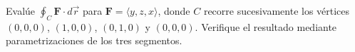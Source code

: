 ﻿Evalúe $\oint_C\mathbf F\cdot d\vec r$ para $\mathbf F=\langle y,z,x\rangle$, donde $C$ recorre sucesivamente los vértices $(0,0,0)$, $(1,0,0)$, $(0,1,0)$ y $(0,0,0)$. Verifique el resultado mediante parametrizaciones de los tres segmentos.

